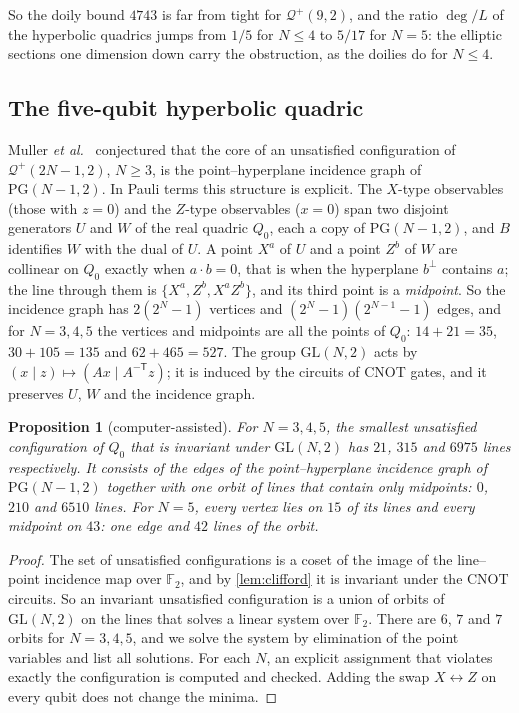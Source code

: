 \documentclass[11pt]{article}
\newtheorem{proposition}[proposition]{Proposition}
\theoremstyle{definition}
\theoremstyle{remark}
\newcommand{\F}{\mathbb{F}}
\newcommand{\Qp}{\mathcal{Q}^{+}}
\newcommand{\dg}{\operatorname{deg}}
\begin{document}
So the doily bound $4743$ is far from tight for $\Qp(9,2)$, and the ratio $\dg/L$ of the hyperbolic quadrics jumps from $1/5$ for $N\le4$ to $5/17$ for $N=5$: the elliptic sections one dimension down carry the obstruction, as the doilies do for $N\le4$.

\subsection{The five-qubit hyperbolic quadric}

Muller \emph{et al.}~\cite[Fig.~15]{Muller24} conjectured that the core of an unsatisfied configuration of $\Qp(2N-1,2)$, $N\ge3$, is the point--hyperplane incidence graph of $\mathrm{PG}(N-1,2)$.
In Pauli terms this structure is explicit.
The $X$-type observables (those with $z=0$) and the $Z$-type observables ($x=0$) span two disjoint generators $U$ and $W$ of the real quadric $Q_0$, each a copy of $\mathrm{PG}(N-1,2)$, and $B$ identifies $W$ with the dual of $U$.
A point $X^a$ of $U$ and a point $Z^b$ of $W$ are collinear on $Q_0$ exactly when $a\cdot b=0$, that is when the hyperplane $b^\perp$ contains $a$; the line through them is $\{X^a,Z^b,X^aZ^b\}$, and its third point is a \emph{midpoint}.
So the incidence graph has $2(2^N-1)$ vertices and $(2^N-1)(2^{N-1}-1)$ edges, and for $N=3,4,5$ the vertices and midpoints are all the points of $Q_0$: $14+21=35$, $30+105=135$ and $62+465=527$.
The group $\mathrm{GL}(N,2)$ acts by $(x\mid z)\mapsto(Ax\mid A^{-\mathsf T}z)$; it is induced by the circuits of CNOT gates, and it preserves $U$, $W$ and the incidence graph.

\begin{proposition}[computer-assisted]\label{prop:invariant}
For $N=3,4,5$, the smallest unsatisfied configuration of $Q_0$ that is invariant under $\mathrm{GL}(N,2)$ has $21$, $315$ and $6975$ lines respectively.
It consists of the edges of the point--hyperplane incidence graph of $\mathrm{PG}(N-1,2)$ together with one orbit of lines that contain only midpoints: $0$, $210$ and $6510$ lines.
For $N=5$, every vertex lies on $15$ of its lines and every midpoint on $43$: one edge and $42$ lines of the orbit.
\end{proposition}

\begin{proof}
The set of unsatisfied configurations is a coset of the image of the line--point incidence map over $\F_2$, and by \cref{lem:clifford} it is invariant under the CNOT circuits.
So an invariant unsatisfied configuration is a union of orbits of $\mathrm{GL}(N,2)$ on the lines that solves a linear system over $\F_2$.
There are $6$, $7$ and $7$ orbits for $N=3,4,5$, and we solve the system by elimination of the point variables and list all solutions.
For each $N$, an explicit assignment that violates exactly the configuration is computed and checked.
Adding the swap $X\leftrightarrow Z$ on every qubit does not change the minima.
\end{proof}
\end{document}
